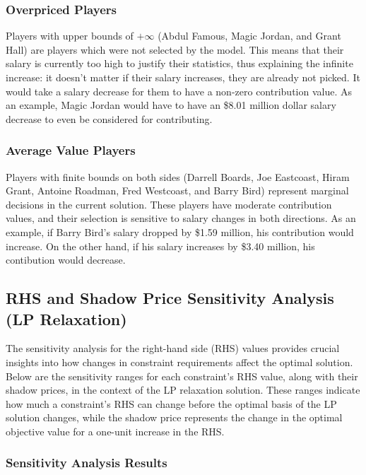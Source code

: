 \documentclass[a4paper,11pt]{article}
\newcommand{\vsp}{\vspace{0.5em}}
\begin{document}
\subsubsection{Overpriced Players}
Players with upper bounds of $+\infty$ (Abdul Famous, Magic Jordan, and Grant Hall) are players which were not selected by the model. This means that their salary is currently too high to justify their statistics, thus explaining the infinite increase: it doesn't matter if their salary increases, they are already not picked. It would take a salary decrease for them to have a non-zero contribution value. As an example, Magic Jordan would have to have an \$8.01 million dollar salary decrease to even be considered for contributing.

\subsubsection{Average Value Players}
Players with finite bounds on both sides (Darrell Boards, Joe Eastcoast, Hiram Grant, Antoine Roadman, Fred Westcoast, and Barry Bird) represent marginal decisions in the current solution. These players have moderate contribution values, and their selection is sensitive to salary changes in both directions. As an example, if Barry Bird's salary dropped by \$1.59 million, his contribution would increase. On the other hand, if his salary increases by \$3.40 million, his contibution would decrease.

\vsp

\subsection{RHS and Shadow Price Sensitivity Analysis (LP Relaxation)}

The sensitivity analysis for the right-hand side (RHS) values provides crucial insights into how changes in constraint requirements affect the optimal solution. Below are the sensitivity ranges for each constraint's RHS value, along with their shadow prices, in the context of the LP relaxation solution. These ranges indicate how much a constraint's RHS can change before the optimal basis of the LP solution changes, while the shadow price represents the change in the optimal objective value for a one-unit increase in the RHS.

\subsubsection{Sensitivity Analysis Results}
\end{document}
